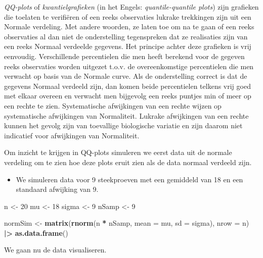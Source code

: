 \documentclass[
  12pt,dutch]{book}
\newenvironment{Shaded}{\begin{snugshade}}{\end{snugshade}}
\newcommand{\AttributeTok}[1]{\textcolor[rgb]{0.13,0.29,0.53}{#1}}
\newcommand{\DecValTok}[1]{\textcolor[rgb]{0.00,0.00,0.81}{#1}}
\newcommand{\FunctionTok}[1]{\textcolor[rgb]{0.13,0.29,0.53}{\textbf{#1}}}
\newcommand{\NormalTok}[1]{#1}
\newcommand{\OtherTok}[1]{\textcolor[rgb]{0.56,0.35,0.01}{#1}}
\newcommand{\SpecialCharTok}[1]{\textcolor[rgb]{0.81,0.36,0.00}{\textbf{#1}}}
\providecommand{\tightlist}{%
  \setlength{\itemsep}{0pt}\setlength{\parskip}{0pt}}
\theoremstyle{definition}
\theoremstyle{definition}
\theoremstyle{definition}
\theoremstyle{definition}
\theoremstyle{remark}
\begin{document}
\emph{QQ-plots} of \emph{kwantielgrafieken} (in het Engels: \emph{quantile-quantile plots}) zijn grafieken die toelaten te verifiëren of een
reeks observaties lukrake trekkingen zijn uit een Normale verdeling. Met
andere woorden, ze laten toe om na te gaan of een reeks observaties al dan
niet de onderstelling tegenspreken dat ze realisaties zijn van een reeks
Normaal verdeelde gegevens. Het principe achter deze grafieken is vrij
eenvoudig. Verschillende percentielen die men heeft berekend voor de gegeven
reeks observaties worden uitgezet t.o.v. de overeenkomstige percentielen die
men verwacht op basis van de Normale curve. Als de onderstelling correct is
dat de gegevens Normaal verdeeld zijn, dan komen beide percentielen telkens
vrij goed met elkaar overeen en verwacht men bijgevolg een reeks puntjes min
of meer op een rechte te zien.
Systematische afwijkingen van een rechte wijzen op systematische afwijkingen
van Normaliteit. Lukrake afwijkingen van een rechte kunnen het gevolg zijn
van toevallige biologische variatie en zijn daarom niet indicatief voor afwijkingen van
Normaliteit.

Om inzicht te krijgen in QQ-plots simuleren we eerst data uit de normale verdeling om te zien hoe deze plots eruit zien als de data normaal verdeeld zijn.

\begin{itemize}
\tightlist
\item
  We simuleren data voor 9 steekproeven met een gemiddeld van 18 en een standaard afwijking van 9.
\end{itemize}

\begin{Shaded}
\begin{Highlighting}[]
\NormalTok{n }\OtherTok{\textless{}{-}} \DecValTok{20}
\NormalTok{mu }\OtherTok{\textless{}{-}} \DecValTok{18}
\NormalTok{sigma }\OtherTok{\textless{}{-}} \DecValTok{9}
\NormalTok{nSamp }\OtherTok{\textless{}{-}} \DecValTok{9}

\NormalTok{normSim }\OtherTok{\textless{}{-}} \FunctionTok{matrix}\NormalTok{(}\FunctionTok{rnorm}\NormalTok{(n }\SpecialCharTok{*}\NormalTok{ nSamp, }\AttributeTok{mean =}\NormalTok{ mu, }\AttributeTok{sd =}\NormalTok{ sigma),}
    \AttributeTok{nrow =}\NormalTok{ n) }\SpecialCharTok{|\textgreater{}}
    \FunctionTok{as.data.frame}\NormalTok{()}
\end{Highlighting}
\end{Shaded}

We gaan nu de data visualiseren.
\end{document}
